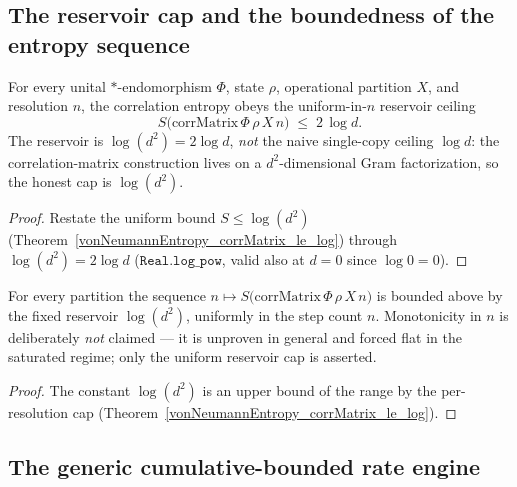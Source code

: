 \subsection{The reservoir cap and the boundedness of the entropy sequence}

\begin{theorem}\label{cntCumulativeEntropy_le_reservoir}
  \leanok
  For every unital \(*\)-endomorphism \(\Phi\), state \(\rho\), operational partition \(X\), and
  resolution \(n\), the correlation entropy obeys the uniform-in-\(n\) reservoir ceiling
  \[
    S\bigl(\mathrm{corrMatrix}\,\Phi\,\rho\,X\,n\bigr) \;\le\; 2\,\log d .
  \]
  The reservoir is \(\log(d^{2}) = 2\log d\), \emph{not} the naive single-copy ceiling \(\log d\): the
  correlation-matrix construction lives on a \(d^{2}\)-dimensional Gram factorization, so the honest
  cap is \(\log(d^{2})\).
\end{theorem}
\begin{proof}\leanok
  Restate the uniform bound \(S \le \log(d^{2})\)
  (Theorem~\ref{vonNeumannEntropy_corrMatrix_le_log}) through \(\log(d^{2}) = 2\log d\)
  (\(\texttt{Real.log\_pow}\), valid also at \(d = 0\) since \(\log 0 = 0\)).
\end{proof}

\begin{theorem}\label{cntEntropySeq_bddAbove}
  \leanok
  For every partition the sequence
  \(n\mapsto S\bigl(\mathrm{corrMatrix}\,\Phi\,\rho\,X\,n\bigr)\) is bounded above by the fixed
  reservoir \(\log(d^{2})\), uniformly in the step count \(n\). Monotonicity in \(n\) is deliberately
  \emph{not} claimed --- it is unproven in general and forced flat in the saturated regime; only the
  uniform reservoir cap is asserted.
\end{theorem}
\begin{proof}\leanok
  The constant \(\log(d^{2})\) is an upper bound of the range by the per-resolution cap
  (Theorem~\ref{vonNeumannEntropy_corrMatrix_le_log}).
\end{proof}

\subsection{The generic cumulative-bounded rate engine}

